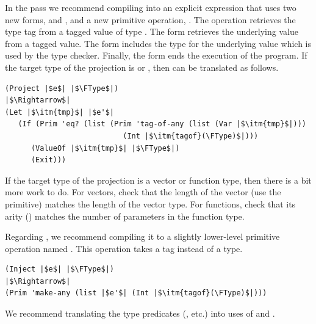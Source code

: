 \documentclass[11pt]{book}
\begin{document}
In the  pass we recommend compiling  into
an explicit  expression that uses two new forms,
 and , and a new primitive operation,
.  The  operation retrieves the type
tag from a tagged value of type .  The  form
retrieves the underlying value from a tagged value.  The
 form includes the type for the underlying value which
is used by the type checker.  Finally, the  form ends the
execution of the program.
%
If the target type of the projection is  or
, then  can be translated as follows.
\begin{center}
\begin{minipage}{1.0\textwidth}
\begin{lstlisting}
(Project |$e$| |$\FType$|)
|$\Rightarrow$|
(Let |$\itm{tmp}$| |$e'$|
   (If (Prim 'eq? (list (Prim 'tag-of-any (list (Var |$\itm{tmp}$|)))
                           (Int |$\itm{tagof}(\FType)$|)))
      (ValueOf |$\itm{tmp}$| |$\FType$|)
      (Exit)))
\end{lstlisting}
\end{minipage}
\end{center}
If the target type of the projection is a vector or function type,
then there is a bit more work to do. For vectors, check that the
length of the vector (use the  primitive) matches
the length of the vector type. For functions, check that its arity
() matches the number of parameters in the
function type.

Regarding , we recommend compiling it to a slightly
lower-level primitive operation named . This operation
takes a tag instead of a type. \\
\begin{center}
\begin{minipage}{1.0\textwidth}
\begin{lstlisting}
(Inject |$e$| |$\FType$|)
|$\Rightarrow$|
(Prim 'make-any (list |$e'$| (Int |$\itm{tagof}(\FType)$|)))
\end{lstlisting}
\end{minipage}
\end{center}

We recommend translating the type predicates (, etc.)
into uses of  and .
\end{document}
